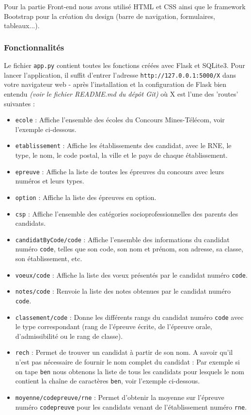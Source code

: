 \documentclass[12pt]{article}
\begin{document}
             Pour la partie Front-end nous avons utilisé \textsf{HTML} et \textsf{CSS} ainsi que le framework \textsf{Bootstrap} pour la création du design (barre de navigation, formulaires, tableaux...).
             

             

            \subsubsection{Fonctionnalités}
            Le fichier \texttt{app.py} contient toutes les fonctions créées avec \textsf{Flask} et \textsf{SQLite3}. Pour lancer l'application, il suffit d'entrer l'adresse \texttt{http://127.0.0.1:5000/X}  dans votre navigateur web - après l'installation et la configuration de \textsf{Flask} bien entendu \textit{(voir le fichier README.md du dépôt Git)} où X est l'une des 'routes' suivantes : 
            \begin{itemize}[label=\textbullet]
            \item \texttt{ecole} : Affiche l'ensemble des écoles du Concours Mines-Télécom, voir l'exemple ci-dessous.
            \item \texttt{etablissement} : Affiche les établissements des candidat, avec le RNE, le type, le nom, le code postal, la ville et le pays de chaque établissement.
            \item \texttt{epreuve} : Affiche la liste de toutes les épreuves du concours avec leurs numéros et leurs types.
            \item \texttt{option} : Affiche la liste des épreuves en option.
            \item \texttt{csp} : Affiche l'ensemble des catégories socioprofessionnelles des parents des candidats.
            \item \texttt{candidatByCode/code} : Affiche l'ensemble des informations du candidat numéro \texttt{code}, telles que son code, son nom et prénom, son adresse, sa classe, son établissement, etc.
            \item \texttt{voeux/code} : Affiche la liste des vœux présentés par le candidat numéro \texttt{code}.
            \item \texttt{notes/code} : Renvoie la liste des notes obtenues par le candidat numéro \texttt{code}.
            \item \texttt{classement/code} : Donne les différents rangs du candidat numéro \texttt{code} avec le type correspondant (rang de l'épreuve écrite, de l'épreuve orale, d'admissibilité ou le rang de classe).
            \item \texttt{rech} : Permet de trouver un candidat à partir de son nom. A savoir qu'il n'est pas nécessaire de fournir le nom complet du candidat : Par exemple si on tape \texttt{ben} nous obtenons la liste de tous les candidats pour lesquels le nom contient la chaîne de caractères \texttt{ben}, voir l'exemple ci-dessous.
            \item \texttt{moyenne/codepreuve/rne} : Permet d'obtenir la moyenne sur l'épreuve numéro \texttt{codepreuve} pour les candidats venant de l'établissement numéro \texttt{rne}.
            \end{itemize}
            
\end{document}
